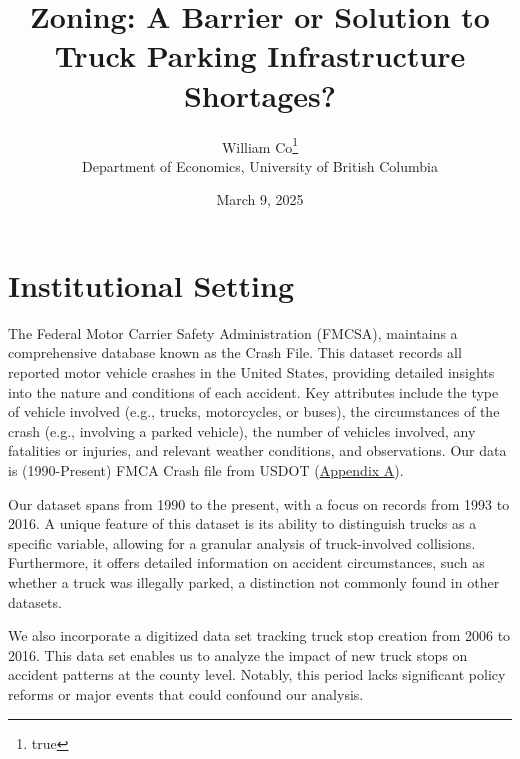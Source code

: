 \documentclass[
  8pt,
  12pt]{article}
\begin{document}
\def\spacingset#1{\renewcommand{\baselinestretch}%
{#1}\small\normalsize} \spacingset{1}



\date{March 9, 2025}
\title{\bf Zoning: A Barrier or Solution to Truck Parking Infrastructure
Shortages?}
\author{
William Co\thanks{true}\\
Department of Economics, University of British Columbia\\
}
\maketitle

\bigskip
\bigskip
\begin{abstract}

\end{abstract}


\newpage
\spacingset{1.9} %

\section{Institutional Setting}\label{institutional-setting}

The Federal Motor Carrier Safety Administration (FMCSA), maintains a
comprehensive database known as the Crash File. This dataset records all
reported motor vehicle crashes in the United States, providing detailed
insights into the nature and conditions of each accident. Key attributes
include the type of vehicle involved (e.g., trucks, motorcycles, or
buses), the circumstances of the crash (e.g., involving a parked
vehicle), the number of vehicles involved, any fatalities or injuries,
and relevant weather conditions, and observations. Our data is
(1990-Present) FMCA Crash file from USDOT
(\label{sec:appendix-a}\hyperref[sec-a.-visualization-of-dataset.-]{Appendix
A}).

Our dataset spans from 1990 to the present, with a focus on records from
1993 to 2016. A unique feature of this dataset is its ability to
distinguish trucks as a specific variable, allowing for a granular
analysis of truck-involved collisions. Furthermore, it offers detailed
information on accident circumstances, such as whether a truck was
illegally parked, a distinction not commonly found in other datasets.

We also incorporate a digitized data set tracking truck stop creation
from 2006 to 2016. This data set enables us to analyze the impact of new
truck stops on accident patterns at the county level. Notably, this
period lacks significant policy reforms or major events that could
confound our analysis.
\end{document}
